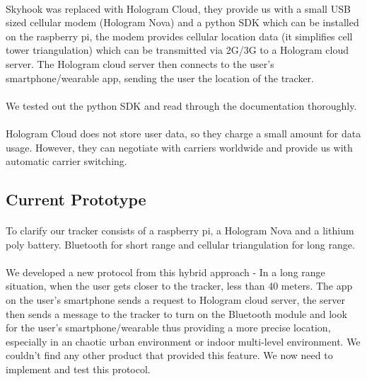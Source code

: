 \documentclass[12pt,a4paper]{article}
\begin{document}
        \paragraph{}
          Skyhook was replaced with Hologram Cloud\cite{Hologram}, they provide us with a small USB sized cellular modem (Hologram Nova) and a python SDK which can be installed on the raspberry pi, the modem provides cellular location data (it simplifies cell tower triangulation) which can be transmitted via 2G/3G to a Hologram cloud server. The Hologram cloud server then connects to the user’s smartphone/wearable app, sending the user the location of the tracker.
        \paragraph{}
          We tested out the python SDK and read through the documentation thoroughly.
        \paragraph{}
          Hologram Cloud does not store user data, so they charge a small amount for data usage. However, they can negotiate with carriers worldwide and provide us with automatic carrier switching.

      \subsection{Current Prototype}
        \paragraph{}
          To clarify our tracker consists of a raspberry pi, a Hologram Nova\cite{Nova} and a lithium poly battery. Bluetooth for short range and cellular triangulation for long range.
        \paragraph{}
          We developed a new protocol from this hybrid approach - In a long range situation, when the user gets closer to the tracker, less than 40 meters. The app on the user’s smartphone sends a request to Hologram cloud server, the server then sends a message to the tracker to turn on the Bluetooth module and look for the user’s smartphone/wearable thus providing a more precise location, especially in an chaotic urban environment or indoor multi-level environment. We couldn’t find any other product that provided this feature. We now need to implement and test this protocol.
\end{document}
